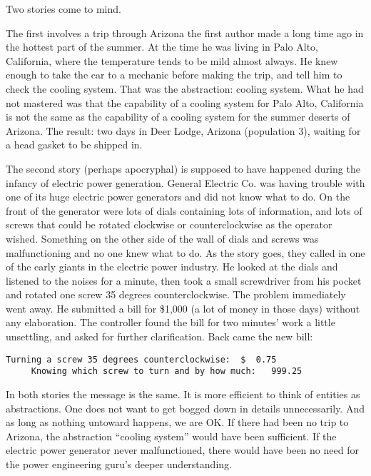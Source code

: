\documentclass{patt}
\begin{document}
Two stories come to mind.

The first involves a trip through Arizona the first author made a long time ago
in the hottest part of the summer.  At the time he was living in Palo Alto,
California, where the temperature tends to be mild almost always.  He knew 
enough to take the car to a mechanic before making the trip, and tell him to 
check the cooling system.  That was the abstraction: cooling system.  What he
 had not mastered was that the capability of a cooling system for Palo Alto, 
California is not the same as the capability of a cooling system for the 
summer deserts of Arizona.  The result: two days in Deer Lodge, Arizona 
(population 3), waiting for a head gasket to be shipped in.

The second story (perhaps apocryphal) is supposed to have happened during
the infancy of electric power generation.  General Electric Co. was having
trouble with one of its huge electric power generators and did not know what
to do.  On the front of the generator were lots of dials containing lots of
information, and lots of screws that could be rotated clockwise or
counterclockwise as the operator wished.  Something on the other side of the
wall of dials and screws was malfunctioning and no one knew what to do. 
As the story goes, they called in one of the early giants in
the electric power industry.  He looked at the dials and listened to the
noises for a minute, then took a small screwdriver from his pocket
and rotated one screw 35 degrees counterclockwise.  The problem
immediately went away.  He submitted a bill for \$1{,}000 (a lot of money in
those days) without any elaboration.  The controller found the bill for
two minutes' work a little unsettling, and asked for further clarification.
Back came the new bill:

\begin{Verbatim}[fontsize=\fontsize{9}{10}]
     Turning a screw 35 degrees counterclockwise:  $  0.75
     Knowing which screw to turn and by how much:   999.25
\end{Verbatim}

In both stories the message is the same.  It is more efficient to
think of entities as abstractions.  One does not want to get bogged
down in details unnecessarily.  And as long as nothing untoward
happens, we are OK.  If there had been no trip to Arizona,
the abstraction ``cooling system'' would have been sufficient.  If the
electric power generator never malfunctioned, there would have been no
need for the power engineering guru's deeper understanding.
\end{document}
